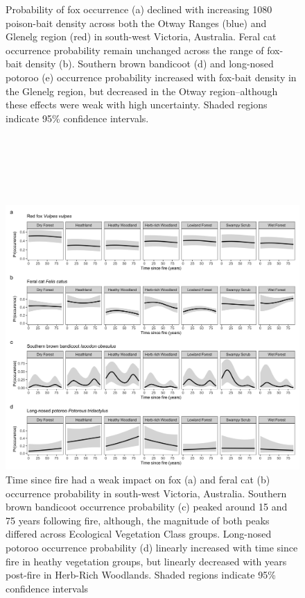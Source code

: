 \documentclass[11pt,a4paper,titlepage,twoside,openright]{style/unimelbthesis}
\begin{document}
\begin{mainmatter}
\begin{figure}
{}

\caption{Probability of fox occurrence (a) declined with increasing 1080 poison-bait density across both the Otway Ranges (blue) and Glenelg region (red) in south-west Victoria, Australia. Feral cat occurrence probability remain unchanged across the range of fox-bait density (b). Southern brown bandicoot (d) and long-nosed potoroo (e) occurrence probability increased with fox-bait density in the Glenelg region, but decreased in the Otway region--although these effects were weak with high uncertainty. Shaded regions indicate 95\% confidence intervals.}\label{fig:occ-1080}
\end{figure}
\newpage

\(~\)

\(~\)

\(~\)
\begin{figure}

{\centering \includegraphics[width=1\linewidth]{figure/c1/tsf} 

}

\caption{Time since fire had a weak impact on fox (a) and feral cat (b) occurrence probability in south-west Victoria, Australia. Southern brown bandicoot occurrence probability (c) peaked around 15 and 75 years following fire, although, the magnitude of both peaks differed across Ecological Vegetation Class groups. Long-nosed potoroo occurrence probability (d) linearly increased with time since fire in heathy vegetation groups, but linearly decreased with years post-fire in Herb-Rich Woodlands. Shaded regions indicate 95\% confidence intervals}\label{fig:occ-tsf}
\end{figure}
\newpage


\end{mainmatter}
\end{document}
